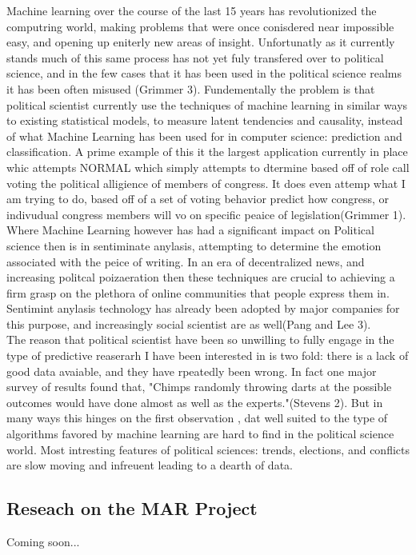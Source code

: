 \documentclass[12pt]{article}
\begin{document}
	Machine learning over the course of the last 15 years has revolutionized the computring world, making problems that were once conisdered near impossible easy, and opening up eniterly new areas of insight. Unfortunatly as it currently stands much of this same process has not yet fuly transfered over to political science, and in the few cases that it has been used in the political science realms it has been often misused (Grimmer 3). Fundementally the problem is that political scientist currently use the techniques of machine learning in similar ways to existing statistical models, to measure latent tendencies and causality, instead of what Machine Learning has been used for in computer science: prediction and classification. A prime example of this it the largest application currently in place whic attempts NORMAL which simply attempts to dtermine based off of role call voting the political alligience of members of congress. It does even attemp what I am trying to do, based off of a set of voting behavior predict how congress, or indivudual congress members will vo on specific peaice of legislation(Grimmer 1). \\

	Where Machine Learning however has had a significant impact on Political science then is in sentiminate anylasis, attempting to determine the emotion associated with the peice of writing. In an era of decentralized news, and increasing politcal poizaeration then these techniques are crucial to achieving a firm grasp on the plethora of online communities that people express them in. Sentimint anylasis technology has already been adopted by major companies for this purpose, and increasingly social scientist are as well(Pang and Lee 3). \\

	The reason that political scientist have been so unwilling to fully engage in the type of predictive reaserarh I have been interested in is two fold: there is a lack of good data avaiable, and they have rpeatedly been wrong. In fact one major survey of results found that, {"Chimps randomly throwing darts at the possible outcomes would have done almost as well as the experts."}(Stevens 2). But in many ways this hinges on the first observation , dat well suited to the type of algorithms favored by machine learning are hard to find in the political science world. Most intresting features of political sciences: trends, elections, and conflicts are slow moving and infreuent leading to a dearth of data. 
\subsection{Reseach on the MAR Project}
Coming soon...
\end{document}
